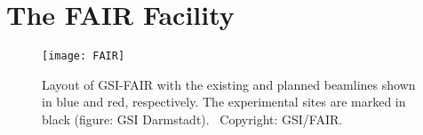 %
%
%
%
%
%
%
\section{The FAIR Facility}


\begin{figure}
	\centering
	\texttt{[image: FAIR]}
	\caption{Layout of GSI-FAIR with the existing and planned beamlines shown in blue and red, respectively. The experimental sites are marked in black (figure: GSI Darmstadt). \textcopyright ~Copyright: GSI/FAIR.}
	\label{fig:FAIRlayout}
\end{figure}


